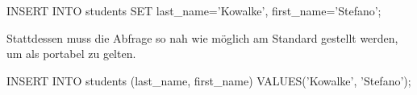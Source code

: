 \begin{listing}[H]
\begin{mysqlcode}
INSERT INTO students SET last_name='Kowalke', first_name='Stefano';
\end{mysqlcode}
\caption{}
\label{lst:notPortableSQL}
\end{listing}

Stattdessen muss die Abfrage so nah wie möglich am Standard gestellt werden, um als portabel zu gelten.

\begin{listing}[H]
\begin{mysqlcode}
INSERT INTO students (last_name, first_name) VALUES('Kowalke', 'Stefano');
\end{mysqlcode}
\caption{}
\label{lst:portableSQL}
\end{listing}

